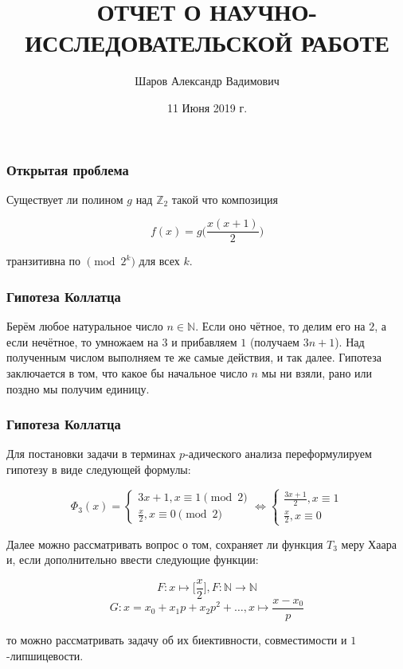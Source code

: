 \documentclass[10pt,utf8,presentation,compress]{beamer}
\title[отчет по НИР]{ОТЧЕТ О НАУЧНО-ИССЛЕДОВАТЕЛЬСКОЙ РАБОТЕ}
\author[Шаров Александр Вадимович]{Шаров Александр Вадимович}
\institute[<<информатика и вычислительная техника>>]{<<информатика и вычислительная техника>>}
\date{11 Июня 2019 г.}
\begin{document}
\frame[plain]{\titlepage}



\begin{frame}
\frametitle{Открытая проблема\label{problem:general}}

Существует ли полином $g$ над $\mathbb Z_2$ такой что композиция 

\begin{equation} \label{problem:1}
f(x)=g\bigg(\frac{x(x+1)}{2}\bigg)	
\end{equation}

\noindent транзитивна по $\pmod {2^{k}}$ для всех $k$.
\end{frame}



\begin{frame}
\frametitle{Гипотеза Коллатца}
Берём любое натуральное число $n \in \mathbb N$. Если оно чётное, то делим его на $2$, а если нечётное, то умножаем на $3$ и прибавляем $1$ (получаем $3n + 1$). Над полученным числом выполняем те же самые действия, и так далее. Гипотеза заключается в том, что какое бы начальное число $n$ мы ни взяли, рано или поздно мы получим единицу.
\end{frame}


\begin{frame}
\frametitle{Гипотеза Коллатца}
Для постановки задачи в терминах $p$-адического анализа переформулируем гипотезу в виде следующей формулы:


\begin{equation} \label{problem:2}
\Phi_3(x)= \begin{cases}
   3x+1, x \equiv 1 \pmod 2
   \\
   \frac{x}{2}, x \equiv 0 \pmod 2
 \end{cases} \Leftrightarrow
\begin{cases}
   \frac{3x+1}{2}, x \equiv 1
   \\
   \frac{x}{2}, x \equiv 0
    \end{cases}
\end{equation}
 
\noindent Далее можно рассматривать вопрос о том, сохраняет ли функция $T_3$ меру Хаара и, если дополнительно ввести следующие функции:

$$ F: x \longmapsto \bigg[\frac{x}{2}\bigg], F: \mathbb N \rightarrow \mathbb N $$
$$ G: x=x_0+x_1p+x_2p^2+\ldots, x \longmapsto \frac{x-x_0}{p}$$

\noindent то можно рассматривать задачу об их биективности, совместимости и $1$-липшицевости.
\end{frame}
\end{document}
